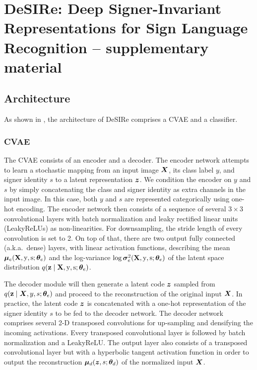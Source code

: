 
\chapter{DeSIRe: Deep Signer-Invariant Representations for Sign Language Recognition -- supplementary material} %

\label{appendix:desire} %

\section{Architecture}
\label{sec:desire_arch}
As shown in , the architecture of DeSIRe comprises a CVAE and a classifier.



\subsection{CVAE}
The CVAE consists of an encoder and a decoder. The encoder network attempts to learn a stochastic mapping from an input image ${\bm{X}}$, its class label $y$, and signer identity $s$ to a latent representation ${\bm{z}}$. We condition the encoder on $y$ and $s$ by simply concatenating the class and signer identity as extra channels in the input image. In this case, both $y$ and $s$ are represented categorically using one-hot encoding. The encoder network then consists of a sequence of several $3\times 3$ convolutional layers with batch normalization and leaky rectified linear units (LeakyReLUs) as non-linearities. For downsampling, the stride length of every convolution is set to 2. On top of that, there are two output fully connected (a.k.a.\ dense) layers, with linear activation functions, describing the mean ${\bm{\mu}}_e({\mathbf{X}},{\textnormal{y}},{\textnormal{s}}; {\bm{\theta}}_e)$ and the log-variance $\log {\bm{\sigma}}_e^2({\mathbf{X}},{\textnormal{y}},{\textnormal{s}}; {\bm{\theta}}_e)$ of the latent space distribution $q({\mathbf{z}} \mid {\mathbf{X}}, {\textnormal{y}}, {\textnormal{s}}; {\bm{\theta}}_e)$.

The decoder module will then generate a latent code ${\bm{z}}$ sampled from $q({\mathbf{z}} \mid {\bm{X}}, y, s; {\bm{\theta}}_e)$ and proceed to the reconstruction of the original input ${\bm{X}}$. In practice, the latent code ${\bm{z}}$ is concatenated with a one-hot representation of the signer identity $s$ to be fed to the decoder network. The decoder network comprises several 2-D transposed convolutions for up-sampling and densifying the incoming activations. Every transposed convolutional layer is followed by batch normalization and a LeakyReLU. The output layer also consists of a transposed convolutional layer but with a hyperbolic tangent activation function in order to output the reconstruction ${\bm{\mu}}_d({\bm{z}},s; {\bm{\theta}}_d)$ of the normalized input ${\bm{X}}$.


